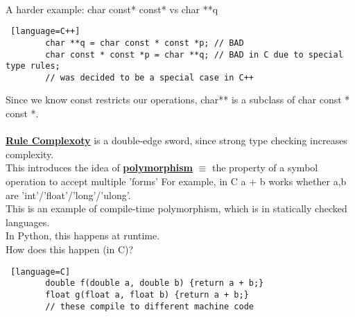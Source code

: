 \documentclass[../../lecture_notes.tex]{subfiles}
\begin{document}
\\
A harder example: char const* const* vs char **q
\begin{lstlisting} [language=C++]
		char **q = char const * const *p; // BAD
		char const * const *p = char **q; // BAD in C due to special type rules; 
		// was decided to be a special case in C++
\end{lstlisting}
Since we know const restricts our operations, char** is a subclass of char const * const *.\\
\\
\textbf{\underline{Rule Complexoty}} is a double-edge sword, since strong type checking increases complexity.\\
This introduces the idea of \textbf{\underline{polymorphism}}
\indent $\equiv$ the property of a symbol operation to accept multiple 'forms'
For example, in C a + b works whether a,b are 'int'/'float'/'long'/'ulong'.\\
	\indent This is an example of compile-time polymorphism, which is in statically checked languages.\\
In Python, this happens at runtime.\\
How does this happen (in C)?
\begin{lstlisting} [language=C]
		double f(double a, double b) {return a + b;}
		float g(float a, float b) {return a + b;}
		// these compile to different machine code
\end{lstlisting}
\end{document}
